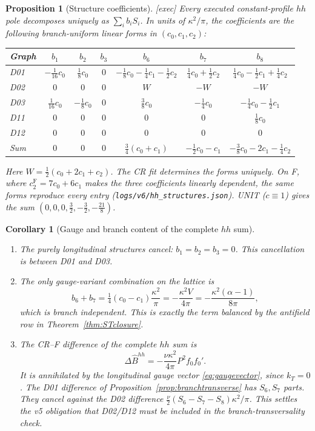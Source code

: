 \documentclass[11pt,a4paper]{article}
\newcommand{\ka}{\kappa}
\newcommand{\Fr}{\mathrm F}
\newcommand{\loc}[1]{\nolinkurl{#1}}
\theoremstyle{plain}
\newtheorem{proposition}[theorem]{Proposition}
\newtheorem{corollary}[theorem]{Corollary}
\theoremstyle{definition}
\theoremstyle{remark}
\numberwithin{equation}{section}
\begin{document}
\begin{proposition}[Structure coefficients]
\label{prop:structures}
\textsf{[exec]}
Every executed constant-profile \(hh\) pole decomposes uniquely as
\(\sum_ib_iS_i\).
In units of \(\ka^2/\pi\), the coefficients are the following
branch-uniform linear forms in \((c_0,c_1,c_2)\):
\begin{center}
\small
\begin{tabular}{@{}lcccccc@{}}
\toprule
Graph & \(b_1\) & \(b_2\) & \(b_3\) & \(b_6\) & \(b_7\) & \(b_8\)\\
\midrule
D01 & \(-\tfrac1{16}c_0\) & \(\tfrac18c_0\) & \(0\) &
\(-\tfrac18c_0-\tfrac14c_1-\tfrac12c_2\) &
\(\tfrac14c_0+\tfrac12c_2\) &
\(\tfrac14c_0-\tfrac12c_1+\tfrac14c_2\)\\
D02 & \(0\) & \(0\) & \(0\) & \(W\) & \(-W\) & \(-W\)\\
D03 & \(\tfrac1{16}c_0\) & \(-\tfrac18c_0\) & \(0\) &
\(\tfrac38c_0\) & \(-\tfrac14c_0\) &
\(-\tfrac14c_0-\tfrac12c_1\)\\
D11 & \(0\) & \(0\) & \(0\) & \(0\) & \(0\) & \(\tfrac18c_0\)\\
D12 & \(0\) & \(0\) & \(0\) & \(0\) & \(0\) & \(0\)\\
\midrule
Sum & \(0\) & \(0\) & \(0\) &
\(\tfrac34(c_0+c_1)\) & \(-\tfrac12c_0-c_1\) &
\(-\tfrac38c_0-2c_1-\tfrac14c_2\)\\
\bottomrule
\end{tabular}
\end{center}
Here \(W=\tfrac12(c_0+2c_1+c_2)\).
The CR fit determines the forms uniquely.
On F, where \(c_2^\Fr=7c_0+6c_1\) makes the three coefficients
linearly dependent, the same forms reproduce every entry
(\loc{logs/v6/hh\_structures.json}).
UNIT (\(c\equiv1\)) gives the sum
\((0,0,0,\tfrac32,-\tfrac32,-\tfrac{21}8)\).
\end{proposition}

\begin{corollary}[Gauge and branch content of the complete \(hh\) sum]
\label{cor:hhcontent}
\leavevmode
\begin{enumerate}[label=\textup{(\roman*)}]
\item The purely longitudinal structures cancel:
\(b_1=b_2=b_3=0\).
This cancellation is between D01 and D03.
\item The only gauge-variant combination on the lattice is
\[
b_6+b_7=\tfrac14(c_0-c_1)\frac{\ka^2}{\pi}
=-\frac{\ka^2V}{4\pi}
=-\frac{\ka^2(\alpha-1)}{8\pi},
\]
which is branch independent.
This is exactly the term balanced by the antifield row in
Theorem~\ref{thm:STclosure}.
\item The CR--F difference of the complete \(hh\) sum is
\[
\Delta\widehat B^{hh}=-\frac{\nu\ka^2}{4\pi}P^2f_0f_0'.
\]
It is annihilated by the longitudinal gauge vector
\eqref{eq:gaugevector}, since \(k_T=0\).
The D01 difference of Proposition~\ref{prop:branchtransverse} has
\(S_6,S_7\) parts. They cancel against the D02 difference
\(\tfrac{\nu}{2}(S_6-S_7-S_8)\ka^2/\pi\).
This settles the v5 obligation that D02/D12 must be included in
the branch-transversality check.
\end{enumerate}
\end{corollary}
\end{document}
